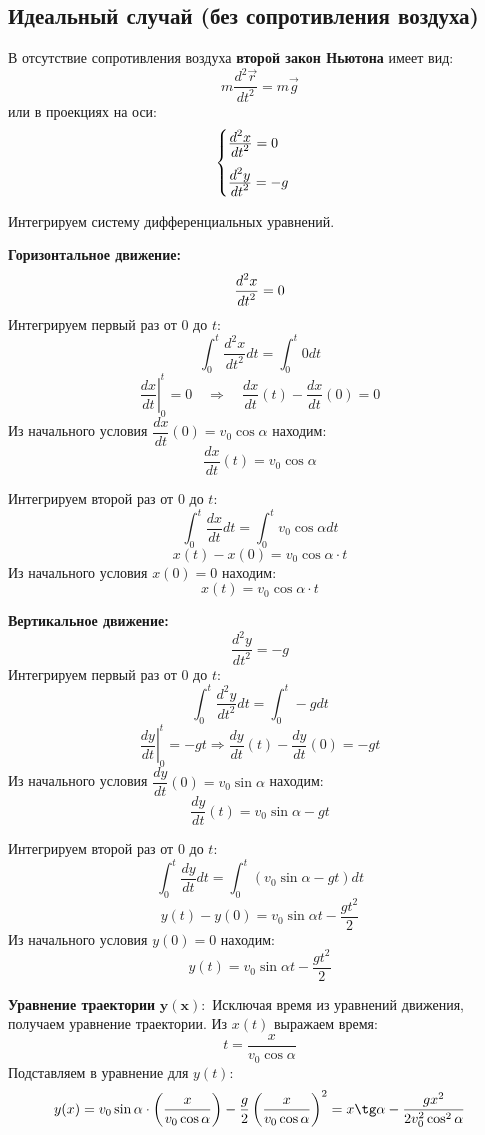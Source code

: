 \begin{center}
    \subsection{Идеальный случай (без сопротивления воздуха)}
\end{center}
    
В отсутствие сопротивления воздуха \textbf{второй закон Ньютона} имеет вид:
\[
m\dfrac{d^2\vec{r}}{dt^2} = m\vec{g}
\]
или в проекциях на оси:
\[
\begin{cases}
\frac{\displaystyle d^2x}{\displaystyle dt^2} = 0 \\[1em]
\frac{\displaystyle d^2y}{\displaystyle dt^2} = -g
\end{cases}
\]

\Solution Интегрируем систему дифференциальных уравнений.

\textbf{Горизонтальное движение:}
\[
\frac{\displaystyle d^2x}{\displaystyle dt^2} = 0
\]
Интегрируем первый раз от 0 до $t$:
\[
\int_0^t \dfrac{d^2x}{dt^2}  dt = \int_0^t 0  dt
\]
\[
\left.\dfrac{dx}{dt}\right|_0^t = 0 \quad \Rightarrow \quad \dfrac{dx}{dt}(t) - \dfrac{dx}{dt}(0) = 0
\]
Из начального условия $\dfrac{dx}{dt}(0) = v_0 \cos\alpha$ находим:
\[
\dfrac{dx}{dt}(t) = v_0 \cos\alpha
\]

Интегрируем второй раз от 0 до $t$:
\[
\int_0^t \dfrac{dx}{dt}  dt = \int_0^t v_0 \cos\alpha  dt
\]
\[
x(t) - x(0) = v_0 \cos\alpha \cdot t
\]
Из начального условия $x(0) = 0$ находим:
\[
x(t) = v_0 \cos\alpha \cdot t
\]

\vspace{0.5cm}
\textbf{Вертикальное движение:}
\[
\dfrac{d^2y}{dt^2} = -g
\]
Интегрируем первый раз от 0 до $t$:
\[
\int_0^t \dfrac{d^2y}{dt^2}  dt = \int_0^t -g  dt
\]
\[
\left.\dfrac{dy}{dt}\right|_0^t = -gt \Rightarrow \dfrac{dy}{dt}(t) - \dfrac{dy}{dt}(0) = -gt
\]
Из начального условия $\dfrac{dy}{dt}(0) = v_0 \sin\alpha$ находим:
\[
\dfrac{dy}{dt}(t) = v_0 \sin\alpha - gt
\]

Интегрируем второй раз от 0 до $t$:
\[
\int_0^t \dfrac{dy}{dt}  dt = \int_0^t (v_0 \sin\alpha - gt)  dt
\]
\[
y(t) - y(0) = v_0 \sin\alpha t - \dfrac{gt^2}{2}
\]
Из начального условия $y(0) = 0$ находим:
\[
y(t) = v_0 \sin\alpha t - \dfrac{gt^2}{2}
\]

\vspace{0.5cm}
\textbf{Уравнение траектории} $\bm{y(x):}$
Исключая время из уравнений движения, получаем уравнение траектории. Из $x(t)$ выражаем время:
\[
t = \dfrac{x}{v_0 \cos\alpha}
\]
Подставляем в уравнение для $y(t)$:
\[
y(x) = v_0 \sin\alpha \cdot \left(\dfrac{x}{v_0 \cos\alpha}\right) - \dfrac{g}{2}\left(\dfrac{x}{v_0 \cos\alpha}\right)^2 = x \tg\alpha - \dfrac{gx^2}{2v_0^2 \cos^2\alpha}
\]

